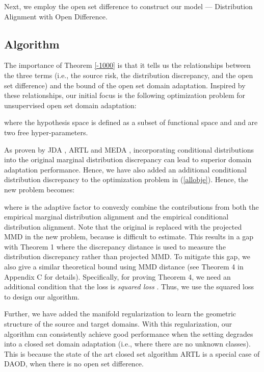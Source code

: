 \documentclass[journal]{IEEEtran}
\begin{document}
Next, we employ the open set difference  to construct our model --- Distribution Alignment with Open Difference.

  \subsection{{Algorithm}}
The importance of {Theorem \ref{-1000}} is that it tells us the relationships between the three terms (i.e., the source risk, the distribution discrepancy, and the open set difference) and the bound of the open set domain adaptation. Inspired by these relationships, our initial focus is  the following optimization problem for unsupervised open set domain adaptation:

where the hypothesis space  is defined as a subset of functional space  and  and  are two free hyper-parameters.


As proven by JDA \cite{long2013transfer}, ARTL \cite{DBLP:journals/tkde/LongWDPY14} and MEDA \cite{DBLP:conf/mm/WangFCYHY18}, incorporating conditional distributions into the original marginal distribution discrepancy can lead to superior domain adaptation performance. Hence, we have also added an additional conditional distribution discrepancy to the optimization problem in (\ref{allobje}). Hence, the new problem becomes:

 where  is the adaptive factor \cite{DBLP:conf/mm/WangFCYHY18} to convexly combine the contributions from both the empirical marginal distribution alignment and the empirical conditional distribution alignment. Note that the original  is replaced with the projected MMD  in the new problem, because  is difficult to estimate. 
  This results in a gap with Theorem 1 where  the discrepancy distance is used to measure the distribution discrepancy rather than projected MMD. To mitigate this gap, we also give a similar theoretical bound using MMD distance (see Theorem 4 in Appendix C for details). Specifically, for proving Theorem 4, we need an additional condition that the loss  is {\textit{squared loss}} . Thus, we use the squared loss to design our algorithm.

{Further, we have added the manifold regularization} \cite{DBLP:journals/jmlr/BelkinNS06} {to learn the geometric structure of the source and target domains. With this regularization, our algorithm can consistently achieve good performance when the setting degrades into a closed set domain adaptation (i.e., where there are no unknown classes). This is because the state of the art closed set algorithm ARTL} \cite{DBLP:journals/tkde/LongWDPY14} {is a special case of DAOD, when there is no open set difference.} 
\end{document}
